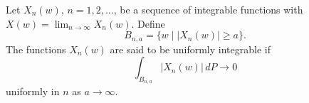 Let $X_n(w)$, $n = 1, 2, \ldots$, be a sequence of integrable functions with $X(w) = \lim_{n \to \infty} X_n(w)$. Define
$$B_{n,a} = \{w \mid |X_n(w)| \geq a\}.$$
The functions $X_n(w)$ are said to be uniformly integrable if
$$\int_{B_{n,a}} |X_n(w)| \, dP \to 0$$
uniformly in $n$ as $a \to \infty$.
